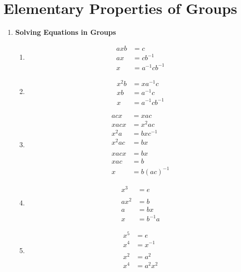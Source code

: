 \setcounter{chapter}{3}
\chapter{Elementary Properties of Groups}
\label{ch:elementary-properties-of-groups}

\begin{enumerate}[label={\Alph*.},font={\bfseries}]
\item {\bf Solving Equations in Groups}
  \begin{enumerate}[label={\arabic*},font={\bfseries}]
  \item
    \begin{align*}
      axb &= c \\
      ax &= cb^{-1} \\
      x &= a^{-1}cb^{-1}
    \end{align*}
  \item
    \begin{align*}
      x^2b &= xa^{-1}c \\
      xb &= a^{-1}c \\
      x &= a^{-1}cb^{-1}
    \end{align*}
  \item
    \begin{align*}
      acx &= xac \\
      xacx &= x^2ac
      \\
      x^2a &= bxc^{-1} \\
      x^2ac &= bx \\
      \\
      xacx &= bx \\
      xac &= b \\
      x &= b(ac)^{-1}
    \end{align*}
  \item
    \begin{align*}
      x^3 &= e \\
      \\
      ax^2 &= b \\
      a &= bx \\
      x &= b^{-1}a
    \end{align*}
  \item
    \begin{align*}
      x^5 &= e \\
      x^4 &= x^{-1} \\
      \\
      x^2 &= a^2 \\
      x^4 &= a^2x^2 \\

\end{align*}
\end{enumerate}
\end{enumerate}
